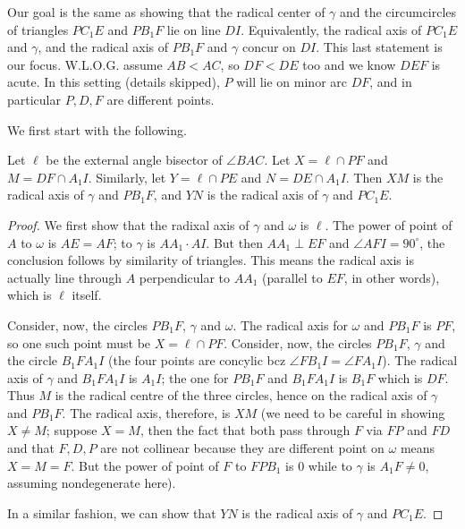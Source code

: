 \documentclass[11pt,a4paper]{article}
\begin{document}
\begin{enumerate}
    Our goal is the same as showing that the radical center of $\gamma$ and the circumcircles of triangles $PC_1E$ and $PB_1F$ lie on line $DI$. Equivalently, the radical axis of $PC_1E$ and $\gamma$, and the radical axis of $PB_1F$ and $\gamma$ concur on $DI$. This last statement is our focus. W.L.O.G. assume $AB<AC$, so $DF<DE$ too and we know $DEF$ is acute. In this setting (details skipped), $P$ will lie on minor arc $DF$, and in particular $P, D, F$ are different points.
    
    We first start with the following. 
    \begin{lemma}
    	Let $\ell$ be the external angle bisector of $\angle BAC$. 
    	Let $X=\ell\cap PF$ and $M=DF\cap A_1I$. 
    	Similarly, let $Y=\ell\cap PE$ and $N=DE\cap A_1I$. 
    	Then $XM$ is the radical axis of $\gamma$ and $PB_1F$, and $YN$ is the radical axis of $\gamma$ and $PC_1E$. 
    \end{lemma}
    
    \begin{proof}
    	We first show that the radixal axis of $\gamma$ and $\omega$ is $\ell$. 
    	The power of point of $A$ to $\omega$ is $AE=AF$; to $\gamma$ is $AA_1\cdot AI$. But then $AA_1\perp EF$ and $\angle AFI=90^{\circ}$, the conclusion follows by similarity of triangles. This means the radical axis is actually line through $A$ perpendicular to $AA_1$ (parallel to $EF$, in other words), which is $\ell$ itself. 
    	
    	Consider, now, the circles $PB_1F$, $\gamma$ and $\omega$. The radical axis for $\omega$ and $PB_1F$ is $PF$, so one such point must be $X=\ell\cap PF$. Consider, now, the circles $PB_1F$, $\gamma$ and the circle $B_1FA_1I$ (the four points are concylic bcz $\angle FB_1I=\angle FA_1I$). The radical axis of $\gamma$ and $B_1FA_1I$ is $A_1I$; the one for $PB_1F$ and $B_1FA_1I$ is $B_1F$ which is $DF$. Thus $M$ is the radical centre of the three circles, hence on the radical axis of $\gamma$ and $PB_1F$. The radical axis, therefore, is $XM$ (we need to be careful in showing $X\neq M$; suppose $X=M$, then the fact that both pass through $F$ via $FP$ and $FD$ and that $F, D, P$ are not collinear because they are different point on $\omega$ means $X=M=F$. But the power of point of $F$ to $FPB_1$ is 0 while to $\gamma$ is $A_1F\neq 0$, assuming nondegenerate here).
    	
    	In a similar fashion, we can show that $YN$ is the radical axis of $\gamma$ and $PC_1E$.
    \end{proof}
	

\end{enumerate}
\end{document}
